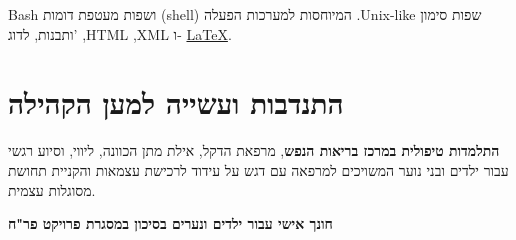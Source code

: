 {Bash
ושפות מעטפת דומות (shell) המיוחסות למערכות הפעלה .Unix-like שפות סימון ותבנות, לדוג' ,HTML ,XML ו-
\setLTR\href{https://github.com/kiril-u/kiril-resume-2021-1/}{\LaTeX}.\unsetLTR  
}
{}
{}

\section{התנדבות ועשייה למען הקהילה} %

{\textbf{התלמדות טיפולית במרכז בריאות הנפש}, מרפאת הדקל, אילת}
{מתן הכוונה, ליווי, וסיוע רגשי עבור ילדים ובני נוער המשויכים למרפאה עם דגש על עידוד לרכישת עצמאות והקניית תחושת מסוגלות עצמית.}
{}

{\textbf{חונך אישי עבור ילדים ונערים בסיכון במסגרת פרויקט פר"ח}}
{}
{}		
\unsetRTL